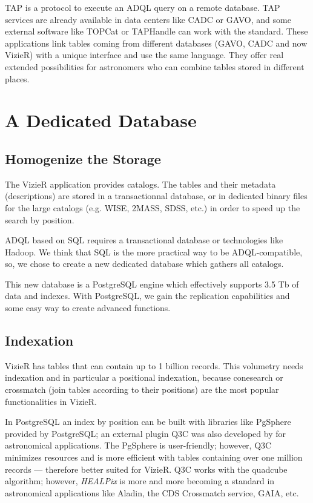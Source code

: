 TAP \citep{tap_2011} is a protocol to execute an ADQL query 
on a remote database. 
TAP services are already available in data centers like CADC or GAVO, and
some external software like TOPCat or TAPHandle can work with
the standard. These applications link tables coming from different databases
(GAVO, CADC and now VizieR) with a unique interface and use the same language.
They offer real extended possibilities for astronomers who can combine 
tables stored in different places. %


\section{A Dedicated Database}

\subsection{Homogenize the Storage}
The VizieR application provides catalogs. The tables and their metadata (descriptions) 
are stored in a transactionnal database, or in dedicated binary files
for the large catalogs (e.g. WISE, 2MASS, SDSS, etc.) in order to speed up the 
search by position.

ADQL based on SQL requires a
transactional database or 
technologies like Hadoop. We think that SQL is the more practical way
to be ADQL-compatible, so, we chose to create a new dedicated database which
gathers all catalogs. 

This new database is a PostgreSQL engine which effectively supports 3.5 Tb
of data and indexes.
With PostgreSQL, we gain the replication capabilities and some easy way
to create advanced functions.

\subsection{Indexation}
VizieR has tables that can contain up to 1 billion records. This volumetry
needs indexation and in particular a positional indexation, because conesearch
or crossmatch (join tables according to their positions) are the most popular 
functionalities in VizieR.

In PostgreSQL an index by position can be built with libraries like PgSphere
provided by PostgreSQL; an external plugin Q3C
was also developed 
by \citet{q3c_2006} for astronomical applications.
The PgSphere is user-friendly; however, Q3C minimizes resources and
is more efficient with tables containing over one million records ---
therefore better suited for VizieR.
Q3C works with the quadcube algorithm;
however, {\em HEALPix} is more and more becoming a standard in
astronomical applications like 
Aladin, the CDS Crossmatch service, GAIA, etc.


